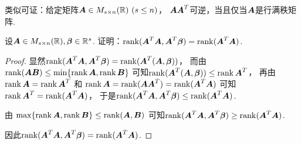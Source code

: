 \begin{remark}
类似可证：给定矩阵\(\boldsymbol{A} \in M_{s \times n}(\mathbb{R})\ (s \leq n)\)，
\(\boldsymbol{A} \boldsymbol{A}^T\)可逆，当且仅当\(\boldsymbol{A}\)是行满秩矩阵.
\end{remark}
\begin{example}\label{example:线性方程组有解的充分必要条件.最小二乘解的存在性}
设\(
	\boldsymbol{A} \in M_{s \times n}(\mathbb{R}),
	\boldsymbol\beta \in \mathbb{R}^s
\).
证明：\(
	\rank(\boldsymbol{A}^T \boldsymbol{A}, \boldsymbol{A}^T \boldsymbol\beta)
	= \rank(\boldsymbol{A}^T \boldsymbol{A})
\).
\begin{proof}
显然\(
	\rank(\boldsymbol{A}^T \boldsymbol{A}, \boldsymbol{A}^T \boldsymbol\beta)
	= \rank(\boldsymbol{A}^T (\boldsymbol{A}, \boldsymbol\beta))
\)，
而由 \hyperref[theorem:线性方程组.矩阵乘积的秩]{$\rank(\boldsymbol{A}\boldsymbol{B}) \leq \min\{\rank\boldsymbol{A},\rank\boldsymbol{B}\}$} 可知\(
	\rank(\boldsymbol{A}^T (\boldsymbol{A}, \boldsymbol\beta))
	\leq \rank\boldsymbol{A}^T
\)，
再由 \hyperref[theorem:向量空间.转置不变秩]{$\rank\boldsymbol{A} = \rank\boldsymbol{A}^T$}
和 \hyperref[equation:矩阵乘积的秩.实矩阵及其转置矩阵的乘积的秩]{$\rank\boldsymbol{A} = \rank(\boldsymbol{A} \boldsymbol{A}^T) = \rank(\boldsymbol{A}^T \boldsymbol{A})$}
可知\(
	\rank\boldsymbol{A}^T
	= \rank(\boldsymbol{A}^T \boldsymbol{A})
\)，
于是\(
	\rank(\boldsymbol{A}^T \boldsymbol{A}, \boldsymbol{A}^T \boldsymbol\beta)
	\leq \rank(\boldsymbol{A}^T \boldsymbol{A})
\).

由 \hyperref[example:矩阵乘积的秩.分块矩阵的秩的等式2]{$\max\{\rank\boldsymbol{A},\rank\boldsymbol{B}\} \leq \rank(\boldsymbol{A},\boldsymbol{B})$} 可知\(
	\rank(\boldsymbol{A}^T \boldsymbol{A}, \boldsymbol{A}^T \boldsymbol\beta)
	\geq \rank(\boldsymbol{A}^T \boldsymbol{A})
\).

因此\(
	\rank(\boldsymbol{A}^T \boldsymbol{A}, \boldsymbol{A}^T \boldsymbol\beta)
	= \rank(\boldsymbol{A}^T \boldsymbol{A})
\).
\end{proof}
\end{example}

